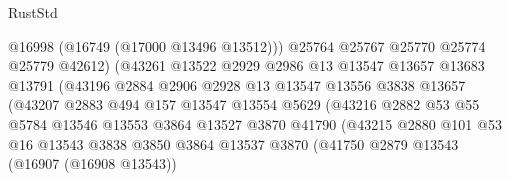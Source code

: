 \begin{lexlean}{RustStd}
\begin{coremodule}
                                    @16998
                                    (@16749 (@17000 @13496 @13512)))
                                  @25764
                                  @25767
                                  @25770
                                  @25774
                                  @25779
                                  @42612)
                                (@43261
                                  @13522
                                  @2929
                                  @2986
                                  @13
                                  @13547
                                  @13657
                                  @13683
                                  @13791
                                  (@43196
                                    @2884
                                    @2906
                                    @2928
                                    @13
                                    @13547
                                    @13556
                                    @3838
                                    @13657
                                    (@43207
                                      @2883
                                      @494
                                      @157
                                      @13547
                                      @13554
                                      @5629
                                      (@43216
                                        @2882
                                        @53
                                        @55
                                        @5784
                                        @13546
                                        @13553
                                        @3864
                                        @13527
                                        @3870
                                        @41790
                                        (@43215
                                          @2880
                                          @101
                                          @53
                                          @16
                                          @13543
                                          @3838
                                          @3850
                                          @3864
                                          @13537
                                          @3870
                                          (@41750
                                            @2879
                                            @13543
                                            (@16907 (@16908 @13543))

\end{coremodule}
\end{lexlean}
